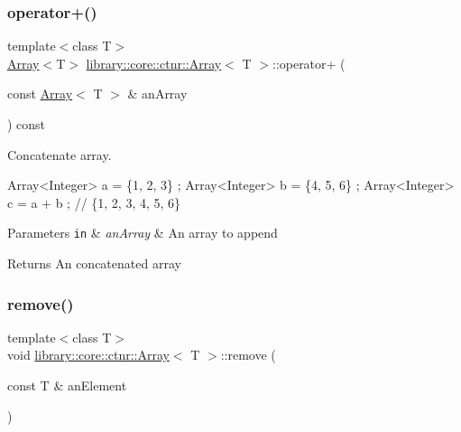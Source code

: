 \subsubsection{\texorpdfstring{operator+()}{operator+()}}
{\footnotesize\ttfamily template$<$class T$>$ \\
\hyperlink{classlibrary_1_1core_1_1ctnr_1_1Array}{Array}$<$T$>$ \hyperlink{classlibrary_1_1core_1_1ctnr_1_1Array}{library\+::core\+::ctnr\+::\+Array}$<$ T $>$\+::operator+ (\begin{DoxyParamCaption}\item[{const \hyperlink{classlibrary_1_1core_1_1ctnr_1_1Array}{Array}$<$ T $>$ \&}]{an\+Array }\end{DoxyParamCaption}) const}



Concatenate array. 


\begin{DoxyCode}
Array<Integer> a = \{1, 2, 3\} ;
Array<Integer> b = \{4, 5, 6\} ;
Array<Integer> c = a + b ; \textcolor{comment}{// \{1, 2, 3, 4, 5, 6\}}
\end{DoxyCode}



\begin{DoxyParams}[1]{Parameters}
\mbox{\tt in}  & {\em an\+Array} & An array to append \\
\hline
\end{DoxyParams}
\begin{DoxyReturn}{Returns}
An concatenated array 
\end{DoxyReturn}
\mbox{\label{classlibrary_1_1core_1_1ctnr_1_1Array_a8e295703797d6e41dad7a45e4101a6db}} 
\subsubsection{\texorpdfstring{remove()}{remove()}\hspace{0.1cm}{\footnotesize\ttfamily [1/2]}}
{\footnotesize\ttfamily template$<$class T$>$ \\
void \hyperlink{classlibrary_1_1core_1_1ctnr_1_1Array}{library\+::core\+::ctnr\+::\+Array}$<$ T $>$\+::remove (\begin{DoxyParamCaption}\item[{const T \&}]{an\+Element }\end{DoxyParamCaption})}



